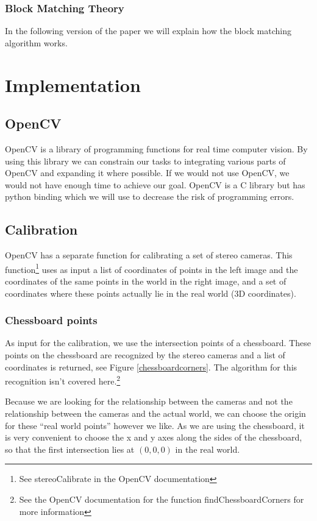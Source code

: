\documentclass[a4paper]{article}
\begin{document}
\subsubsection{Block Matching Theory}
\label{bm_theory}
In the following version of the paper we will explain how the block
matching algorithm works.


\section{Implementation}

\subsection{OpenCV}
\label{opencv} OpenCV is a library of programming functions for real
time computer vision. By using this library we can constrain our tasks
to integrating various parts of OpenCV and expanding it where
possible. If we would not use OpenCV, we would not have enough time to
achieve our goal. OpenCV is a C library but has python binding which
we will use to decrease the risk of programming errors.

\subsection{Calibration}
\label{calib_implement} OpenCV has a separate function for calibrating
a set of stereo cameras. This function\footnote{See stereoCalibrate in
the OpenCV documentation} uses as input a list of coordinates of
points in the left image and the coordinates of the same points in the
world in the right image, and a set of coordinates where these points
actually lie in the real world (3D coordinates).

\subsubsection{Chessboard points} As input for the calibration, we use
the intersection points of a chessboard. These points on the
chessboard are recognized by the stereo cameras and a list of
coordinates is returned, see Figure \ref{chessboardcorners}. The
algorithm for this recognition isn't covered here.\footnote{See the
OpenCV documentation for the function findChessboardCorners for more
information}

Because we are looking for the relationship between the cameras and
not the relationship between the cameras and the actual world, we can
choose the origin for these ``real world points'' however we like. As
we are using the chessboard, it is very convenient to choose the x and
y axes along the sides of the chessboard, so that the first
intersection lies at $(0, 0, 0)$ in the real world.
\end{document}
